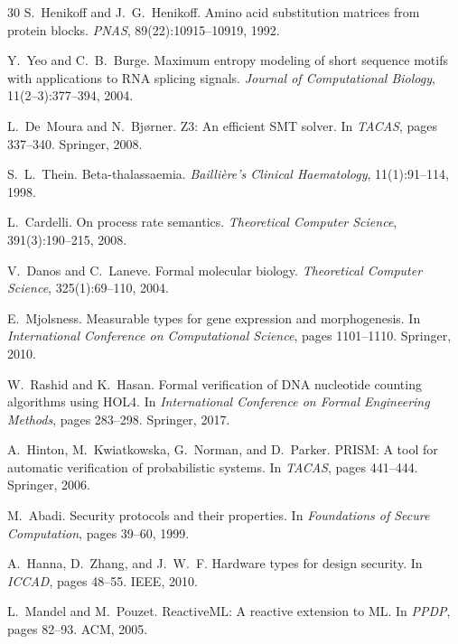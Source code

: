 \documentclass[runningheads]{llncs}
\begin{document}
\begin{thebibliography}{30}
S.~Henikoff and J.~G.~Henikoff.
\newblock Amino acid substitution matrices from protein blocks.
\newblock \emph{PNAS}, 89(22):10915--10919, 1992.

Y.~Yeo and C.~B.~Burge.
\newblock Maximum entropy modeling of short sequence motifs with
  applications to RNA splicing signals.
\newblock \emph{Journal of Computational Biology}, 11(2--3):377--394,
  2004.

L.~De~Moura and N.~Bj{\o}rner.
\newblock Z3: An efficient SMT solver.
\newblock In \emph{TACAS}, pages 337--340. Springer, 2008.

S.~L.~Thein.
\newblock Beta-thalassaemia.
\newblock \emph{Bailli\`{e}re's Clinical Haematology},
  11(1):91--114, 1998.

L.~Cardelli.
\newblock On process rate semantics.
\newblock \emph{Theoretical Computer Science}, 391(3):190--215, 2008.

V.~Danos and C.~Laneve.
\newblock Formal molecular biology.
\newblock \emph{Theoretical Computer Science}, 325(1):69--110, 2004.

E.~Mjolsness.
\newblock Measurable types for gene expression and morphogenesis.
\newblock In \emph{International Conference on Computational
  Science}, pages 1101--1110. Springer, 2010.

W.~Rashid and K.~Hasan.
\newblock Formal verification of DNA nucleotide counting algorithms
  using HOL4.
\newblock In \emph{International Conference on Formal Engineering
  Methods}, pages 283--298. Springer, 2017.

A.~Hinton, M.~Kwiatkowska, G.~Norman, and D.~Parker.
\newblock PRISM: A tool for automatic verification of probabilistic
  systems.
\newblock In \emph{TACAS}, pages 441--444. Springer, 2006.

M.~Abadi.
\newblock Security protocols and their properties.
\newblock In \emph{Foundations of Secure Computation}, pages 39--60,
  1999.

A.~Hanna, D.~Zhang, and J.~W.~F.
\newblock Hardware types for design security.
\newblock In \emph{ICCAD}, pages 48--55. IEEE, 2010.

L.~Mandel and M.~Pouzet.
\newblock ReactiveML: A reactive extension to ML.
\newblock In \emph{PPDP}, pages 82--93. ACM, 2005.


\end{thebibliography}
\end{document}
